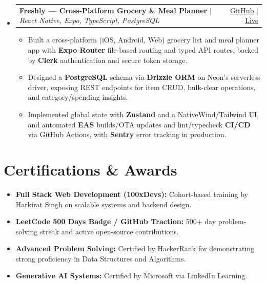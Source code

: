 \documentclass[10pt,a4paper]{article}
\makeatletter
\newcommand{\resumeItem}[1]{
  \item\small{#1}
}
\newcommand{\resumeProjectHeading}[2]{
    \vspace{-1pt}\item
    \begin{tabular*}{0.97\textwidth}{l@{\extracolsep{\fill}}r}
      \small#1 & #2 \\
    \end{tabular*}\vspace{-2pt}
}
\makeatother
\begin{document}
\begin{itemize}[leftmargin=0.15in, label={}]
      \begin{itemize}
        \resumeItem{Engineered a touch-responsive collaborative canvas on the \textbf{Raw HTML5 Canvas API}, optimizing frame rendering across devices.}
        \resumeItem{Architected a custom \textbf{WebSocket protocol} for asynchronous events, syncing state across clients with sub-50ms latency.}
      \end{itemize}
    \resumeProjectHeading
      {\textbf{Freshly --- Cross-Platform Grocery \& Meal Planner} $|$ \emph{React Native, Expo, TypeScript, PostgreSQL}}{ \href{https://github.com/gyana-rj/freshly-expo}{GitHub} $|$ \href{https://devgyana-freshly.expo.app}{Live} \hspace{5pt}}
      \begin{itemize}
        \resumeItem{Built a cross-platform (iOS, Android, Web) grocery list and meal planner app with \textbf{Expo Router} file-based routing and typed API routes, backed by \textbf{Clerk} authentication and secure token storage.}
        \resumeItem{Designed a \textbf{PostgreSQL} schema via \textbf{Drizzle ORM} on Neon's serverless driver, exposing REST endpoints for item CRUD, bulk-clear operations, and category/spending insights.}
        \resumeItem{Implemented global state with \textbf{Zustand} and a NativeWind/Tailwind UI, and automated \textbf{EAS} builds/OTA updates and lint/typecheck \textbf{CI/CD} via GitHub Actions, with \textbf{Sentry} error tracking in production.}
      \end{itemize}
\end{itemize}
\section{Certifications \& Awards}
\begin{itemize}[leftmargin=0.15in, label={}]
    \resumeItem{\textbf{Full Stack Web Development (100xDevs):} Cohort-based training by Harkirat Singh on scalable systems and backend design.}
    \resumeItem{\textbf{LeetCode 500 Days Badge / GitHub Traction:} 500+ day problem-solving streak and active open-source contributions.}
    \resumeItem{\textbf{Advanced Problem Solving:} Certified by HackerRank for demonstrating strong proficiency in Data Structures and Algorithms.}
    \resumeItem{\textbf{Generative AI Systems:} Certified by Microsoft via LinkedIn Learning.}
\end{itemize}
\end{document}
